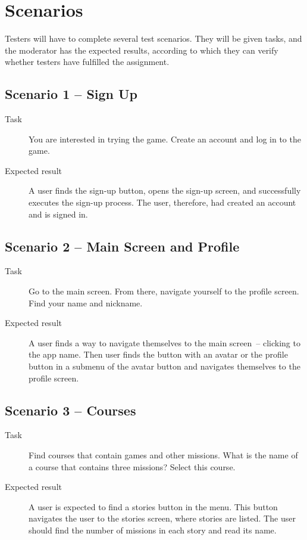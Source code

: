 \section{Scenarios}

Testers will have to complete several test scenarios.
They will be given tasks, and the moderator has the expected results, according to which they can verify whether testers have fulfilled the assignment.

\subsection*{Scenario 1 -- Sign Up}

\begin{description}
    \item[Task] You are interested in trying the game.
    Create an account and log in to the game.
    \item[Expected result] A user finds the sign-up button, opens the sign-up screen, and successfully executes the sign-up process.
    The user, therefore, had created an account and is signed in.
\end{description}

\subsection*{Scenario 2 -- Main Screen and Profile}

\begin{description}
    \item[Task] Go to the main screen.
    From there, navigate yourself to the profile screen.
    Find your name and nickname.
    \item[Expected result] A user finds a way to navigate themselves to the main screen~-- clicking to the app name.
    Then user finds the button with an avatar or the profile button in a submenu of the avatar button and navigates themselves to the profile screen.
\end{description}

\subsection*{Scenario 3 -- Courses}

\begin{description}
    \item[Task] Find courses that contain games and other missions.
    What is the name of a course that contains three missions?
    Select this course.
    \item[Expected result] A user is expected to find a stories button in the menu.
    This button navigates the user to the stories screen, where stories are listed.
    The user should find the number of missions in each story and read its name.
\end{description}

